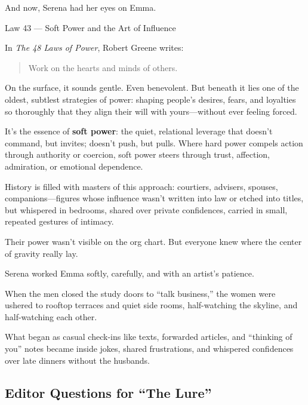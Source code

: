 And now, Serena had her eyes on Emma.

\medskip

\begin{PhilosophicalSidebar}{Law 43 --- Soft Power and the Art of Influence}

  In \textit{The 48 Laws of Power}, Robert Greene writes:
  
  \begin{quote}
    Work on the hearts and minds of others.
  \end{quote}
  
  On the surface, it sounds gentle. Even benevolent. But beneath it lies one of the oldest, subtlest strategies of 
  power: shaping people’s desires, fears, and loyalties so thoroughly that they align their will with yours—without 
  ever feeling forced.

  \medskip

  It’s the essence of \textbf{soft power}: the quiet, relational leverage that doesn’t command, but invites; doesn’t 
  push, but pulls. Where hard power compels action through authority or coercion, soft power steers through trust, 
  affection, admiration, or emotional dependence.
  
  \medskip
  
  History is filled with masters of this approach: courtiers, advisers, spouses, companions—figures whose influence 
  wasn’t written into law or etched into titles, but whispered in bedrooms, shared over private confidences, carried 
  in small, repeated gestures of intimacy.

  \medskip
  
  Their power wasn’t visible on the org chart.  But everyone knew where the center of gravity really lay.
  
\end{PhilosophicalSidebar}

\medskip

Serena worked Emma softly, carefully, and with an artist’s patience.  

When the men closed the study doors to ``talk business,'' the women were ushered to rooftop terraces and quiet side rooms, 
half-watching the skyline, and half-watching each other.  

What began as casual check-ins like texts, forwarded articles, and ``thinking of you'' notes became inside jokes, shared 
frustrations, and whispered confidences over late dinners without the husbands.  


\subsection*{Editor Questions for ``The Lure''}

